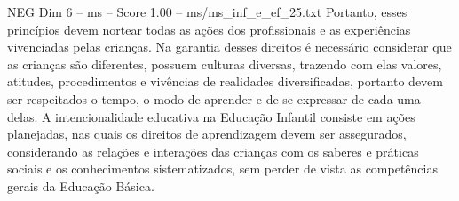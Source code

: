 \begin{textsample}{NEG Dim 6 – ms – Score 1.00 – ms/ms\_inf\_e\_ef\_25.txt}
Portanto, esses princípios devem nortear todas as ações dos profissionais e as experiências vivenciadas pelas crianças.
Na garantia desses direitos é necessário considerar que as crianças são diferentes, possuem culturas diversas, trazendo com elas valores, atitudes, procedimentos e vivências de realidades diversificadas, portanto devem ser respeitados o tempo, o modo de aprender e de se expressar de cada uma delas.
A intencionalidade educativa na Educação Infantil consiste em ações planejadas, nas quais os direitos de aprendizagem devem ser assegurados, considerando as relações e interações das crianças com os saberes e práticas sociais e os conhecimentos sistematizados, sem perder de vista as competências gerais da Educação Básica.

\end{textsample}
